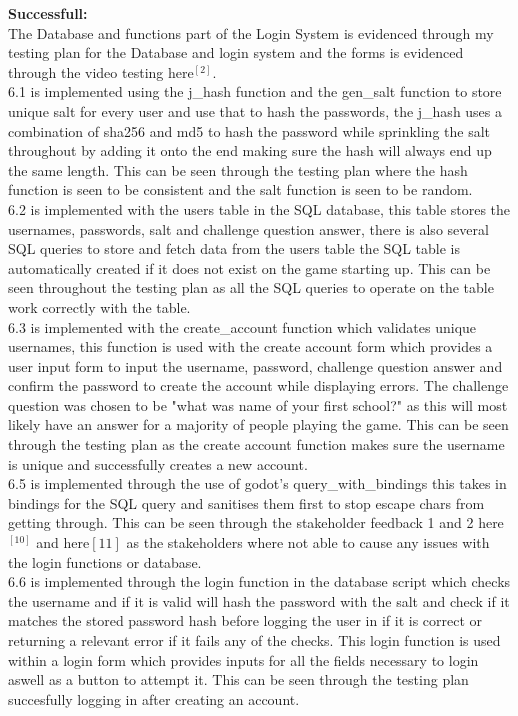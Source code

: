 \documentclass{article}
\begin{document}
        \textbf{Successfull:}\\
        The Database and functions part of the Login System is evidenced through my testing plan for the Database and login system and the forms is evidenced through the video testing here$^{[2]}$.\\
        6.1 is implemented using the j\_hash function and the gen\_salt function to store unique salt for every user and use that to hash the passwords, the j\_hash uses a combination of sha256 and md5 to hash the password while sprinkling the salt throughout by adding it onto the end making sure the hash will always end up the same length. This can be seen through the testing plan where the hash function is seen to be consistent and the salt function is seen to be random.\\
        6.2 is implemented with the users table in the SQL database, this table stores the usernames, passwords, salt and challenge question answer, there is also several SQL queries to store and fetch data from the users table the SQL table is automatically created if it does not exist on the game starting up. This can be seen throughout the testing plan as all the SQL queries to operate on the table work correctly with the table.\\
        6.3 is implemented with the create\_account function which validates unique usernames, this function is used with the create account form which provides a user input form to input the username, password, challenge question answer and confirm the password to create the account while displaying errors. The challenge question was chosen to be "what was name of your first school?" as this will most likely have an answer for a majority of people playing the game. This can be seen through the testing plan as the create account function makes sure the username is unique and successfully creates a new account.\\
        6.5 is implemented through the use of godot's query\_with\_bindings this takes in bindings for the SQL query and sanitises them first to stop escape chars from getting through. This can be seen through the stakeholder feedback 1 and 2 here$^{[10]}$ and here${[11]}$ as the stakeholders where not able to cause any issues with the login functions or database.\\
        6.6 is implemented through the login function in the database script which checks the username and if it is valid will hash the password with the salt and check if it matches the stored password hash before logging the user in if it is correct or returning a relevant error if it fails any of the checks. This login function is used within a login form which provides inputs for all the fields necessary to login aswell as a button to attempt it. This can be seen through the testing plan succesfully logging in after creating an account.\\
\end{document}
